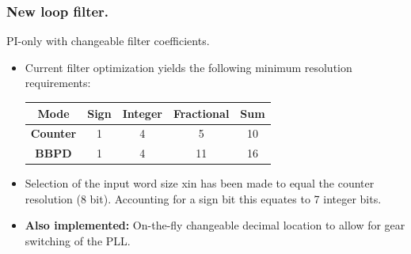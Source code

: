 \documentclass[t, screen, aspectratio=43]{beamer}
\begin{document}
\begin{frame}
	\frametitle{New loop filter.}
	\begin{block}{PI-only with changeable filter coefficients.}
		\begin{minipage}{6cm}
			\vspace{1em}
			\tiny

			\begin{itemize}[itemsep=4pt,label=\protect---]
				\item Current filter optimization yields the following minimum resolution requirements:

		\begin{table}[h!]
			\centering
			\def\arraystretch{1.5}		
			\setlength\arrayrulewidth{0.75pt}
			\setlength{\tabcolsep}{1em} %
			\begin{tabular}{|c|c|c|c|c|}
				\hline 
				\rule[-1ex]{0pt}{2.5ex} \cellcolor{gray!40}\textbf{Mode} & \cellcolor{gray!40}\textbf{Sign} & \cellcolor{gray!40}\textbf{Integer}& \cellcolor{gray!40}\textbf{Fractional}& \cellcolor{gray!40}\textbf{Sum}\\ 
				\hline 
				\rule[-1ex]{0pt}{2.5ex} \textbf{Counter}  & 1 & 4 & 5 & 10\\ 
				\hline 
				\rule[-1ex]{0pt}{2.5ex} \textbf{BBPD}  & 1 & 4 & 11 & 16\\ 
				\hline 
			\end{tabular} 
		\end{table}  
				\item Selection of the input word size xin has been made to equal the counter resolution (8 bit). Accounting for a sign bit this equates to 7 integer bits.
				\item \textbf{Also implemented:} On-the-fly changeable decimal location to allow for gear switching of the PLL.
			\end{itemize}


\end{minipage}
\end{block}
\end{frame}
\end{document}
